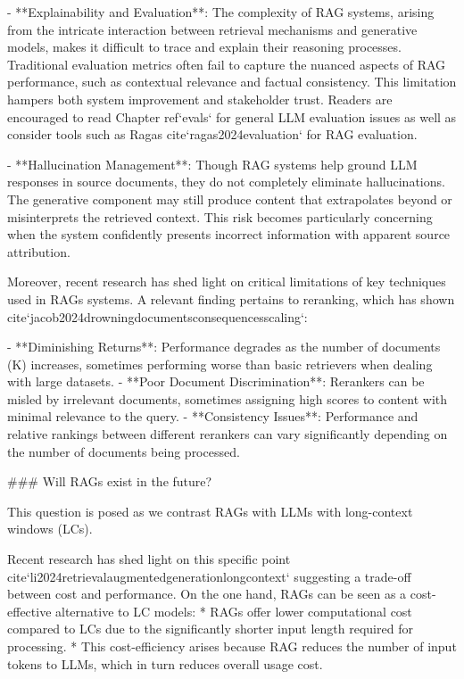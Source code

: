 {{- **Explainability and Evaluation**: The complexity of RAG systems, arising from the intricate interaction between retrieval mechanisms and generative models, makes it difficult to trace and explain their reasoning processes. Traditional evaluation metrics often fail to capture the nuanced aspects of RAG performance, such as contextual relevance and factual consistency. This limitation hampers both system improvement and stakeholder trust. Readers are encouraged to read Chapter {ref}`evals` for general LLM evaluation issues as well as consider tools such as Ragas {cite}`ragas2024evaluation` for RAG evaluation.
 
- **Hallucination Management**: Though RAG systems help ground LLM responses in source documents, they do not completely eliminate hallucinations. The generative component may still produce content that extrapolates beyond or misinterprets the retrieved context. This risk becomes particularly concerning when the system confidently presents incorrect information with apparent source attribution.


Moreover, recent research has shed light on critical limitations of key techniques used in RAGs systems. A relevant finding pertains to reranking, which has shown {cite}`jacob2024drowningdocumentsconsequencesscaling`:

- **Diminishing Returns**: Performance degrades as the number of documents (K) increases, sometimes performing worse than basic retrievers when dealing with large datasets.
- **Poor Document Discrimination**: Rerankers can be misled by irrelevant documents, sometimes assigning high scores to content with minimal relevance to the query.
- **Consistency Issues**: Performance and relative rankings between different rerankers can vary significantly depending on the number of documents being processed.

### Will RAGs exist in the future?

This question is posed as we contrast RAGs with LLMs with long-context windows (LCs).

Recent research has shed light on this specific point {cite}`li2024retrievalaugmentedgenerationlongcontext` suggesting a trade-off between cost and performance. On the one hand, RAGs can be seen as a cost-effective alternative to LC models:
*   RAGs offer lower computational cost compared to LCs due to the significantly shorter input length required for processing.
*   This cost-efficiency arises because RAG reduces the number of input tokens to LLMs, which in turn reduces overall usage cost.

}}

